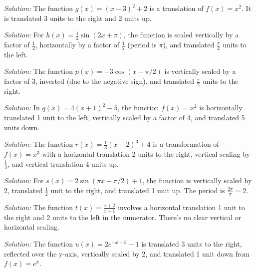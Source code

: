 \documentclass[a4paper,12pt]{book}
\newenvironment{solution}[1][]
{\par\noindent\textit{Solution:} \rmfamily}{\medskip}
\begin{document}
\begin{solution}[1]
The function \( g(x) = (x - 3)^2 + 2 \) is a translation of \( f(x) = x^2 \). It is translated 3 units to the right and 2 units up.
\end{solution}

\begin{solution}[2]
For \( h(x) = \frac{1}{2}\sin(2x + \pi) \), the function is scaled vertically by a factor of \( \frac{1}{2} \), horizontally by a factor of \( \frac{1}{2} \) (period is \( \pi \)), and translated \( \frac{\pi}{2} \) units to the left.
\end{solution}

\begin{solution}[3]
The function \( p(x) = -3\cos(x - \pi/2) \) is vertically scaled by a factor of 3, inverted (due to the negative sign), and translated \( \frac{\pi}{2} \) units to the right.
\end{solution}

\begin{solution}[4]
In \( q(x) = 4(x + 1)^2 - 5 \), the function \( f(x) = x^2 \) is horizontally translated 1 unit to the left, vertically scaled by a factor of 4, and translated 5 units down.
\end{solution}

\begin{solution}[5]
The function \( r(x) = \frac{1}{3}(x - 2)^3 + 4 \) is a transformation of \( f(x) = x^3 \) with a horizontal translation 2 units to the right, vertical scaling by \( \frac{1}{3} \), and vertical translation 4 units up.
\end{solution}

\begin{solution}[6]
For \( s(x) = 2\sin(\pi x - \pi/2) + 1 \), the function is vertically scaled by 2, translated \( \frac{1}{2} \) unit to the right, and translated 1 unit up. The period is \( \frac{2\pi}{\pi} = 2 \).
\end{solution}

\begin{solution}[7]
The function \( t(x) = \frac{x + 2}{x - 1} \) involves a horizontal translation 1 unit to the right and 2 units to the left in the numerator. There's no clear vertical or horizontal scaling.
\end{solution}

\begin{solution}[8]
The function \( u(x) = 2e^{-x + 3} - 1 \) is translated 3 units to the right, reflected over the y-axis, vertically scaled by 2, and translated 1 unit down from \( f(x) = e^x \).
\end{solution}
\end{document}
